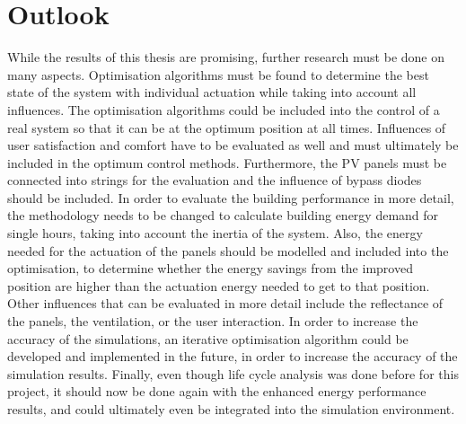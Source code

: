 \chapter{Outlook}
\label{ch:outlook}

While the results of this thesis are promising, further research must be done on many aspects. Optimisation algorithms must be found to determine the best state of the system with individual actuation while taking into account all influences. The optimisation algorithms could be included into the control of a real system so that it can be at the optimum position at all times. Influences of user satisfaction and comfort have to be evaluated as well and must ultimately be included in the optimum control methods. Furthermore, the PV panels must be connected into strings for the evaluation and the influence of bypass diodes should be included. In order to evaluate the building performance in more detail, the methodology needs to be changed to calculate building energy demand for single hours, taking into account the inertia of the system. Also, the energy needed for the actuation of the panels should be modelled and included into the optimisation, to determine whether the energy savings from the improved position are higher than the actuation energy needed to get to that position. Other influences that can be evaluated in more detail include the reflectance of the panels, the ventilation, or the user interaction. In order to increase the accuracy of the simulations, an iterative optimisation algorithm could be developed and implemented in the future, in order to increase the accuracy of the simulation results. Finally, even though life cycle analysis was done before for this project, it should now be done again with the enhanced energy performance results, and could ultimately even be integrated into the simulation environment. 





